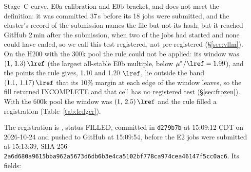 Stage~C curve, E0a calibration and E0b bracket, and does not meet the definition: it was committed 37\,s before its 18 jobs were submitted, and the cluster's record of the submission names the file but not its hash, but it reached GitHub 2\,min after the submission, when two of the jobs had started and none could have ended, so we call this test registered, not pre-registered (\S\ref{sec:vllm}). On the H200 with the 300k pool the rule could not be applied: its window was $(1,\,1.3)\,\lref$ (the largest all-stable E0b multiple, below $\mu^*/\lref=1.99$), and the points the rule gives, 1.10 and 1.20 $\lref$, lie outside the band $(1.1,\,1.17)\,\lref$ that its 10\% margin at each edge of the window leaves, so the fill returned INCOMPLETE and that cell has no registered test (\S\ref{sec:frozen}). With the 600k pool the window was $(1,\,2.5)\,\lref$ and the rule filled a registration (Table~\ref{tab:ledger}).

The registration is , status FILLED, committed in \texttt{d279b7b} at 15:09:12 CDT on 2026-10-24 and pushed to GitHub at 15:09:54, before the E2 jobs were submitted at 15:13:39, SHA-256 \texttt{2a6d680a9615bba962a5673d6db6b3e4\allowbreak ca5102bf778ca974cea46147f5cc0ac6}. Its fields:

